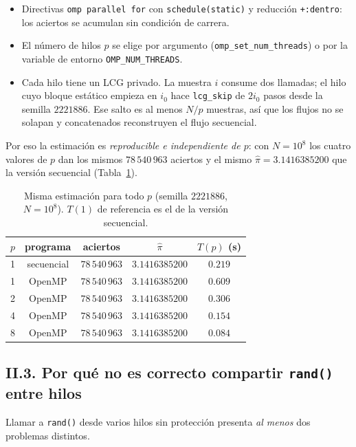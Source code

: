 \documentclass[12pt,a4paper]{article}
\begin{document}
\begin{itemize}
  \item Directivas \texttt{omp parallel for} con \texttt{schedule(static)} y reducci\'on \texttt{+:dentro}: los aciertos se acumulan sin condici\'on de carrera.
  \item El n\'umero de hilos $p$ se elige por argumento (\texttt{omp\_set\_num\_threads}) o por la variable de entorno \texttt{OMP\_NUM\_THREADS}.
  \item Cada hilo tiene un LCG privado. La muestra $i$ consume dos llamadas; el hilo cuyo bloque est\'atico empieza en $i_0$ hace \texttt{lcg\_skip} de $2i_0$ pasos desde la semilla $2221886$. Ese salto es al menos $N/p$ muestras, as\'i que los flujos no se solapan y concatenados reconstruyen el flujo secuencial.
\end{itemize}

Por eso la estimaci\'on es \emph{reproducible e independiente de $p$}: con $N=10^8$ los cuatro valores de $p$ dan los mismos $78\,540\,963$ aciertos y el mismo $\hat\pi=3.1416385200$ que la versi\'on secuencial (Tabla~\ref{tab:repro}).

\begin{table}[ht]
  \centering
  \caption{Misma estimaci\'on para todo $p$ (semilla $2221886$, $N=10^8$). $T(1)$ de referencia es el de la versi\'on secuencial.}
  \label{tab:repro}
  \begin{tabular}{rcccc}
    \toprule
    $p$ & programa & aciertos & $\hat\pi$ & $T(p)$ (s) \\
    \midrule
    1 & secuencial & $78\,540\,963$ & $3.1416385200$ & $0.219$ \\
    1 & OpenMP     & $78\,540\,963$ & $3.1416385200$ & $0.609$ \\
    2 & OpenMP     & $78\,540\,963$ & $3.1416385200$ & $0.306$ \\
    4 & OpenMP     & $78\,540\,963$ & $3.1416385200$ & $0.154$ \\
    8 & OpenMP     & $78\,540\,963$ & $3.1416385200$ & $0.084$ \\
    \bottomrule
  \end{tabular}
\end{table}

\subsection*{II.3. Por qu\'e no es correcto compartir \texttt{rand()} entre hilos}

Llamar a \texttt{rand()} desde varios hilos sin protecci\'on presenta \emph{al menos} dos problemas distintos.
\end{document}
